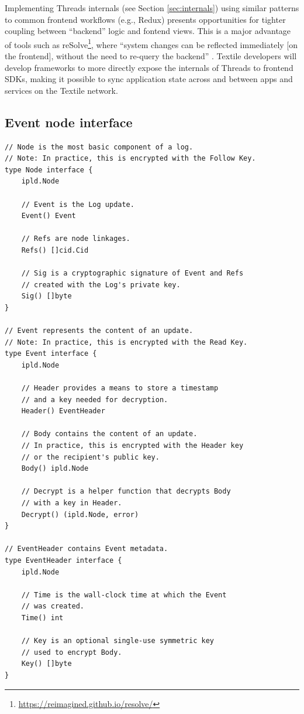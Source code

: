 \documentclass{textile}
\begin{document}
Implementing Threads internals (see Section \ref{sec:internals}) using similar patterns to common frontend workflows (e.g., Redux) presents opportunities for tighter coupling between ``backend'' logic and fontend views. This is a major advantage of tools such as reSolve\footnote{\url{https://reimagined.github.io/resolve/}}, where ``system changes can be reflected immediately [on the frontend], without the need to re-query the backend'' \cite{ereminReduxInspiredBackend2019}. Textile developers will develop frameworks to more directly expose the internals of Threads to frontend SDKs, making it possible to sync application state across and between apps and services on the Textile network.


\nocite{*}

\printbibliography

\appendix 
\begin{example*}[!p]
\section{Event node interface} \label{appx:EventNode} %
\begin{lstlisting}
// Node is the most basic component of a log.
// Note: In practice, this is encrypted with the Follow Key.
type Node interface {
    ipld.Node

    // Event is the Log update.
    Event() Event

    // Refs are node linkages.
    Refs() []cid.Cid

    // Sig is a cryptographic signature of Event and Refs
    // created with the Log's private key.
    Sig() []byte
}

// Event represents the content of an update.
// Note: In practice, this is encrypted with the Read Key.
type Event interface {
    ipld.Node

    // Header provides a means to store a timestamp
    // and a key needed for decryption.
    Header() EventHeader

    // Body contains the content of an update.
    // In practice, this is encrypted with the Header key
    // or the recipient's public key.
    Body() ipld.Node

    // Decrypt is a helper function that decrypts Body
    // with a key in Header.
    Decrypt() (ipld.Node, error)
}

// EventHeader contains Event metadata.
type EventHeader interface {
    ipld.Node

    // Time is the wall-clock time at which the Event
    // was created.
    Time() int

    // Key is an optional single-use symmetric key
    // used to encrypt Body.
    Key() []byte
}
\end{lstlisting} 
\end{example*} 
\end{document}
